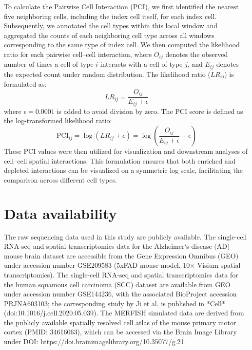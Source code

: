 \documentclass[10pt,a4paper]{article}
\begin{document}
To calculate the Pairwise Cell Interaction (PCI), we first identified the nearest five neighboring cells, including the index cell itself, for each index cell. Subsequently, we annotated the cell types within this local window and aggregated the counts of each neighboring cell type across all windows corresponding to the same type of index cell. We then computed the likelihood ratio for each pairwise cell--cell interaction, where $O_{ij}$ denotes the observed number of times a cell of type $i$ interacts with a cell of type $j$, and $E_{ij}$ denotes the expected count under random distribution. The likelihood ratio ($LR_{ij}$) is formulated as:
\begin{equation}    
LR_{ij} = \frac{O_{ij}}{E_{ij} + \epsilon}
\end{equation}
where $\epsilon = 0.0001$ is added to avoid division by zero. The PCI score is defined as the log-transformed likelihood ratio:
\begin{equation}    
\text{PCI}_{ij} = \log(LR_{ij} + \epsilon) = \log\left(\frac{O_{ij}}{E_{ij} + \epsilon} + \epsilon\right)
\end{equation}
These PCI values were then utilized for visualization and downstream analyses of cell--cell spatial interactions. This formulation ensures that both enriched and depleted interactions can be visualized on a symmetric log scale, facilitating the comparison across different cell types.

\section*{Data availability}

The raw sequencing data used in this study are publicly available. The single-cell RNA-seq and spatial transcriptomics data for the Alzheimer‘s disease (AD) mouse brain dataset are accessible from the Gene Expression Omnibus (GEO) under accession number GSE209583 (5xFAD mouse model, 10× Visium spatial transcriptomics). The single-cell RNA-seq and spatial transcriptomics data for the human squamous cell carcinoma (SCC) dataset are available from GEO under accession number GSE144236, with the associated BioProject accession PRJNA603103; the corresponding study by Ji et al. is published in *Cell* (doi:10.1016/j.cell.2020.05.039). The MERFISH simulated data are derived from the publicly available spatially resolved cell atlas of the mouse primary motor cortex (PMID: 34616063), which can be accessed via the Brain Image Library under DOI: https://doi.brainimagelibrary.org/10.35077/g.21.
\end{document}

